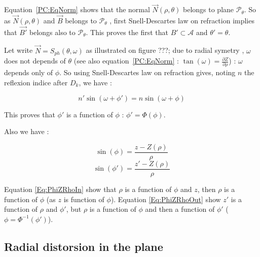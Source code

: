 Equation~\ref{PC:EqNorm} shows that the normal  $\vec{N}(\rho,\theta)$ belongs to plane $\mathcal{P}_{\theta}$. 
So as $\vec{N}(\rho,\theta)$ and $\vec{B}$  belongs to $\mathcal{P}_{\theta}$ , first Snell-Descartes law on refraction 
implies that  $\vec{B'}$ belongs also to  $\mathcal{P}_{\theta}$.  This proves the first
that $B' \subset  \mathcal{A}$ and $\theta'=\theta$.

Let write $\vec{N} = S_{ph}(\theta,\omega)$ as illustrated on  figure ???;  due to radial symetry  ,
$\omega$ does not  depends of $\theta$ (see also equation~\ref{PC:EqNorm} : $\tan(\omega)= \frac{\partial Z}{\partial \rho}$) :  $\omega$  depends only of $\phi$.
So using Snell-Descartes law on refraction gives, noting $n$ the reflexion indice after $D_k$, we have :

\begin{equation}
	n'  \sin(\omega + \phi') = n  \sin(\omega + \phi)
\end{equation}

This proves that $\phi'$ is a function of $\phi$ :  $\phi' = \Phi(\phi)$.

Also we have  :


\begin{equation}
	\sin(\phi) = \frac {z-Z(\rho) }{\rho}
	\label{Eq:PhiZRhoIn}
\end{equation}
\begin{equation}
	\sin(\phi') = \frac {z'-Z(\rho) }{\rho}
	\label{Eq:PhiZRhoOut}
\end{equation}

Equation \ref{Eq:PhiZRhoIn} show that $\rho$ is a function of $\phi$  and $z$, then $\rho$ is a function of $\phi$ (as $z$ is function of $\phi$).
Equation \ref{Eq:PhiZRhoOut} show $z'$ is a function of $\rho$ and $\phi'$, but $\rho$ is a function of  $\phi$ and
then a function of $\phi'$  ($\phi = \Phi^{-1}(\phi')$).



\subsection{Radial distorsion in the plane}

